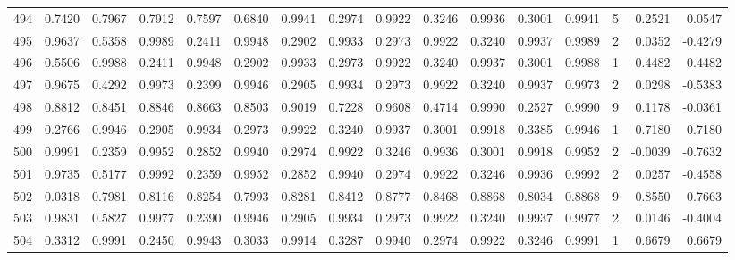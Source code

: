 \begin{tabular}{lrrrrrrrrrrrrrrr}
494 &      0.7420 &  0.7967 &  0.7912 &  0.7597 &  0.6840 &  0.9941 &  0.2974 &  0.9922 &  0.3246 &  0.9936 &   0.3001 &     0.9941 &      5 &                    0.2521 &                     0.0547 \\
495 &      0.9637 &  0.5358 &  0.9989 &  0.2411 &  0.9948 &  0.2902 &  0.9933 &  0.2973 &  0.9922 &  0.3240 &   0.9937 &     0.9989 &      2 &                    0.0352 &                    -0.4279 \\
496 &      0.5506 &  0.9988 &  0.2411 &  0.9948 &  0.2902 &  0.9933 &  0.2973 &  0.9922 &  0.3240 &  0.9937 &   0.3001 &     0.9988 &      1 &                    0.4482 &                     0.4482 \\
497 &      0.9675 &  0.4292 &  0.9973 &  0.2399 &  0.9946 &  0.2905 &  0.9934 &  0.2973 &  0.9922 &  0.3240 &   0.9937 &     0.9973 &      2 &                    0.0298 &                    -0.5383 \\
498 &      0.8812 &  0.8451 &  0.8846 &  0.8663 &  0.8503 &  0.9019 &  0.7228 &  0.9608 &  0.4714 &  0.9990 &   0.2527 &     0.9990 &      9 &                    0.1178 &                    -0.0361 \\
499 &      0.2766 &  0.9946 &  0.2905 &  0.9934 &  0.2973 &  0.9922 &  0.3240 &  0.9937 &  0.3001 &  0.9918 &   0.3385 &     0.9946 &      1 &                    0.7180 &                     0.7180 \\
500 &      0.9991 &  0.2359 &  0.9952 &  0.2852 &  0.9940 &  0.2974 &  0.9922 &  0.3246 &  0.9936 &  0.3001 &   0.9918 &     0.9952 &      2 &                   -0.0039 &                    -0.7632 \\
501 &      0.9735 &  0.5177 &  0.9992 &  0.2359 &  0.9952 &  0.2852 &  0.9940 &  0.2974 &  0.9922 &  0.3246 &   0.9936 &     0.9992 &      2 &                    0.0257 &                    -0.4558 \\
502 &      0.0318 &  0.7981 &  0.8116 &  0.8254 &  0.7993 &  0.8281 &  0.8412 &  0.8777 &  0.8468 &  0.8868 &   0.8034 &     0.8868 &      9 &                    0.8550 &                     0.7663 \\
503 &      0.9831 &  0.5827 &  0.9977 &  0.2390 &  0.9946 &  0.2905 &  0.9934 &  0.2973 &  0.9922 &  0.3240 &   0.9937 &     0.9977 &      2 &                    0.0146 &                    -0.4004 \\
504 &      0.3312 &  0.9991 &  0.2450 &  0.9943 &  0.3033 &  0.9914 &  0.3287 &  0.9940 &  0.2974 &  0.9922 &   0.3246 &     0.9991 &      1 &                    0.6679 &                     0.6679 \\

\end{tabular}
